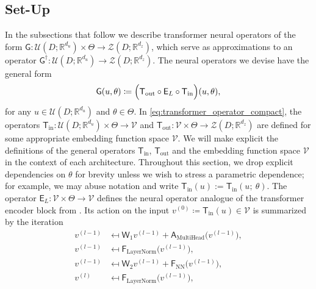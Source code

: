 \documentclass[twoside]{article}
\newcommand{\1}{\mathbbm{1}}
\newcommand{\R}{\mathbbm{R}}
\newcommand{\cU}{\mathcal{U}}
\newcommand{\cZ}{\mathcal{Z}}
\newcommand{\cV}{\mathcal{V}}
\newcommand{\sA}{\mathsf{A}}
\newcommand{\sT}{\mathsf{T}}
\newcommand{\sF}{\mathsf{F}}
\newcommand{\sE}{\mathsf{E}}
\newcommand{\sG}{\mathsf{G}}
\newcommand{\sW}{\mathsf{W}}
\newcommand{\as}[1]{{\color{darkred}{#1}}}
\newcommand{\ml}[1]{{\color{cyan}{#1}}}
\providecommand{\mathbbm}{\mathbb} %
\begin{document}
\subsection{Set-Up}
\label{subsec:setup}
In the subsections that follow we describe transformer neural operators of the form $\sG:\cU(D;\R^{d_u})\times \Theta \to \cZ(D;\R^{d_z})$, which serve as approximations to an operator $\sG^\dagger:\cU(D;\R^{d_u}) \to \cZ(D;\R^{d_z})$. The neural operators we devise have the general form
\begin{equation}
\label{eq:transformer_operator_compact}
\sG(u,\theta) \coloneqq \Bigl(\sT_{\textrm{out}}\circ \sE_L \circ \sT_{\textrm{in}}\Bigr) (u,\theta),
\end{equation}
for any $u\in \cU(D;\R^{d_u})$ and $\theta \in \Theta$. In \eqref{eq:transformer_operator_compact}, the operators $\sT_{\textrm{in}}:\cU(D;\R^{d_u})\times \Theta \to \cV$ and $\sT_{\textrm{out}}:\cV\times \Theta \to \cZ(D;\R^{d_z})$ are defined for some appropriate embedding function space $\cV$.  We will make explicit the definitions of the general operators $\sT_{\textrm{in}}$, $\sT_{\textrm{out}}$ and the embedding function space $\cV$ in the context of each architecture. 
Throughout this section, we drop explicit dependencies on $\theta$ for brevity unless we wish to stress a parametric dependence; for example, we may abuse notation and write $\sT_\textrm{in}(u) := \sT_\textrm{in}(u; \ \theta)$.
The operator $\sE_L:\cV\times \Theta\to\cV$ defines the neural operator analogue of the transformer encoder block from \citet{vaswani2017attention}. Its action on the input $v^{(0)}\coloneqq \sT_{\textrm{in}}(u)\in\cV$ is summarized by the iteration
\begin{subequations}
\label{eq:recurrence_enc_def}
\begin{align}
    v^{(l-1)} &\mapsfrom {\sW_1}v^{(l-1)} + \sA_{\textrm{MultiHead}}\big(v^{(l-1)}\big), \\
    v^{(l-1)} &\mapsfrom \sF_{\textrm{LayerNorm}}\big(v^{(l-1)}\big), \\
    v^{(l-1)} &\mapsfrom {\sW_2}v^{(l-1)} + \sF_{\textrm{NN}}\big( v^{(l-1)}\big),\\
    v^{(l)} &\mapsfrom \sF_{\textrm{LayerNorm}}\big(v^{(l-1)}\big),
\end{align}
\end{subequations}
\end{document}
